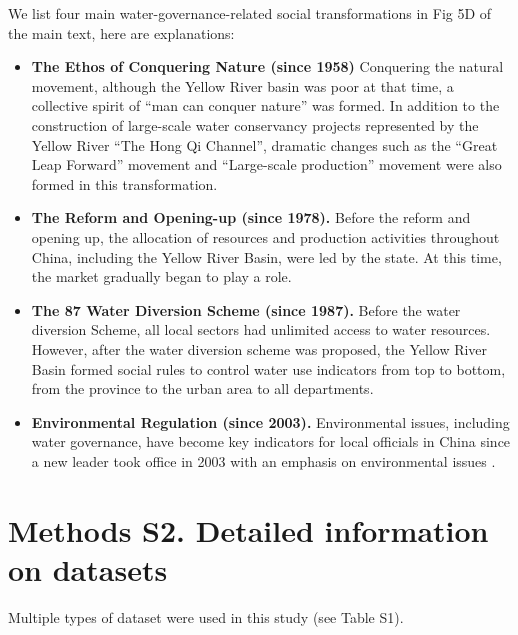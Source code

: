 \documentclass[9pt,twoside,lineno]{pnas-new}
\begin{document}
We list four main water-governance-related social transformations in Fig 5D of the main text, here are explanations:

\begin{itemize}
    \item \textbf{The Ethos of Conquering Nature (since 1958)} Conquering the natural movement, although the Yellow River basin was poor at that time, a collective spirit of ``man can conquer nature'' was formed. In addition to the construction of large-scale water conservancy projects represented by the Yellow River ``The Hong Qi Channel'', dramatic changes such as the ``Great Leap Forward'' movement and ``Large-scale production'' movement were also formed in this transformation.
    \item \textbf{The Reform and Opening-up (since 1978).} Before the reform and opening up, the allocation of resources and production activities throughout China, including the Yellow River Basin, were led by the state. At this time, the market gradually began to play a role.
    \item \textbf{The 87 Water Diversion Scheme (since 1987).} Before the water diversion Scheme, all local sectors had unlimited access to water resources. However, after the water diversion scheme was proposed, the Yellow River Basin formed social rules to control water use indicators from top to bottom, from the province to the urban area to all departments.
    \item \textbf{Environmental Regulation (since 2003).} Environmental issues, including water governance, have become key indicators for local officials in China since a new leader took office in 2003 with an emphasis on environmental issues
    \cite{heWateringEnvironmentalRegulation2020}.
\end{itemize}



\newpage
\section*{Methods S2. Detailed information on datasets}

Multiple types of dataset were used in this study (see Table S1).
\end{document}

